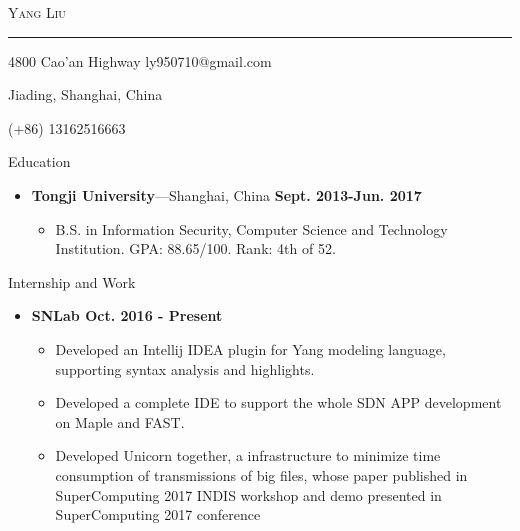 \documentclass[10pt,oneside]{article}
\newcommand{\bigname}[1]{
	\begin{center}\fontfamily{phv}\selectfont\Huge\scshape#1\end{center}
}
\newenvironment{ressection}[1]{
	\vspace{4pt}
	{\fontfamily{phv}\selectfont\Large#1}
	\begin{itemize}
	\vspace{3pt}
}{
	\end{itemize}
}
\newcommand{\resitem}[1]{
	\vspace{-4pt}
	\item \begin{flushleft} #1 \end{flushleft}
}
\newcommand{\ressubitem}[1]{
	\vspace{-1pt}
	\item \begin{flushleft} #1 \end{flushleft}
}
\newcommand{\resbigitem}[3]{
	\vspace{-5pt}
	\item
	\textbf{#1}---#2 \
	\textit{#3}
}
\newenvironment{ressubsec}[3]{
	\resbigitem{#1}{#2}{#3}
	\vspace{-2pt}
	\begin{itemize}
}{
	\end{itemize}
}
\newenvironment{reslist}[1]{
	\resitem{\textbf{#1}}
	\vspace{-5pt}
	\begin{itemize}
}{
	\end{itemize}
}
\begin{document}
 \selectfont

\bigname{Yang Liu}

\vspace{-8pt} \rule{\textwidth}{1pt}

\vspace{-1pt} {4800 Cao'an Highway \hfill ly950710@gmail.com}

\vspace{-1pt} {Jiading, Shanghai, China}

\vspace{-1pt} {(+86) 13162516663}

\vspace{8 pt}

\newcommand{\textsharp}{$\sharp$}

\begin{ressection}{Education}
	\begin{ressubsec}{Tongji University}{Shanghai, China \hfill \textbf{Sept. 2013-Jun. 2017}}{}
		\ressubitem{B.S. in Information Security, Computer Science and Technology Institution. GPA: 88.65/100. Rank: 4th of 52. }
	\end{ressubsec}
\end{ressection}


\begin{ressection}{Internship and Work}
	\begin{reslist}{SNLab \hfill Oct. 2016 - Present}
		\ressubitem{Developed an Intellij IDEA plugin for Yang modeling language, supporting syntax analysis and highlights.}
		\ressubitem{Developed a complete IDE to support the whole SDN APP development on Maple and FAST.}
		\ressubitem{Developed Unicorn together, a infrastructure to minimize time consumption of transmissions of big files, whose paper published in SuperComputing 2017 INDIS workshop and demo presented in SuperComputing 2017 conference}
	\end{reslist}
\end{ressection}
	
\end{document}
